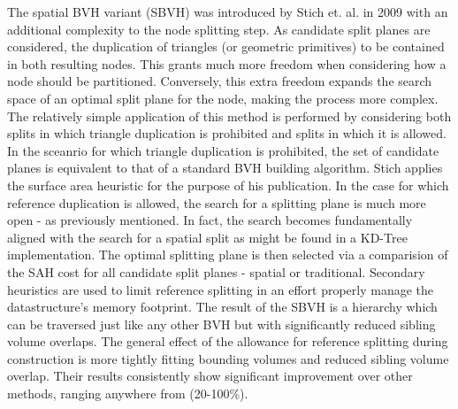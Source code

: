 \documentclass[12pt, a4paper]{article}
\begin{document}
The spatial BVH variant (SBVH) was introduced by Stich et. al. in 2009 \cite{Stich_2009} with an additional complexity to the node splitting step. As candidate split planes are considered, the duplication of triangles (or geometric primitives) to be contained in both resulting nodes. This grants much more freedom when considering how a node should be partitioned. Conversely, this extra freedom expands the search space of an optimal split plane for the node, making the process more complex. The relatively simple application of this method is performed by considering both splits in which triangle duplication is prohibited and splits in which it is allowed. In the sceanrio for which triangle duplication is prohibited, the set of candidate planes is equivalent to that of a standard BVH building algorithm. Stich applies the surface area heuristic for the purpose of his publication. In the case for which reference duplication is allowed, the search for a splitting plane is much more open - as previously mentioned. In fact, the search becomes fundamentally aligned with the search for a spatial split as might be found in a KD-Tree implementation. The optimal splitting plane is then selected via a comparision of the SAH cost for all candidate split planes - spatial or traditional. Secondary heuristics are used to limit reference splitting in an effort properly manage the datastructure's memory footprint. The result of the SBVH is a hierarchy which can be traversed just like any other BVH but with significantly reduced sibling volume overlaps. The general effect of the allowance for reference splitting during construction is more tightly fitting bounding volumes and reduced sibling volume overlap. Their results consistently show significant improvement over other methods, ranging anywhere from (20-100\%).\cite{Stich_2009}

\end{document}
